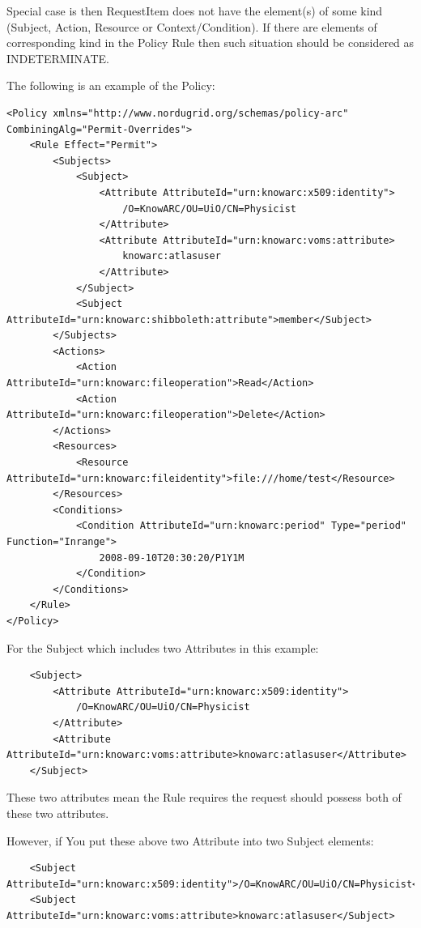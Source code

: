 \documentclass{article}                            %
\begin{document}
Special case is then RequestItem does not have the element(s) of some kind (Subject, Action, Resource or Context/Condition). If there are elements of corresponding kind in the Policy Rule then such situation should be considered as INDETERMINATE.

The following is an example of the Policy:

\begin{verbatim}
<Policy xmlns="http://www.nordugrid.org/schemas/policy-arc" CombiningAlg="Permit-Overrides">
    <Rule Effect="Permit">
        <Subjects>
            <Subject>
                <Attribute AttributeId="urn:knowarc:x509:identity">
                    /O=KnowARC/OU=UiO/CN=Physicist
                </Attribute>
                <Attribute AttributeId="urn:knowarc:voms:attribute>
                    knowarc:atlasuser
                </Attribute>
            </Subject>
            <Subject AttributeId="urn:knowarc:shibboleth:attribute">member</Subject>
        </Subjects>
        <Actions>
            <Action AttributeId="urn:knowarc:fileoperation">Read</Action>
            <Action AttributeId="urn:knowarc:fileoperation">Delete</Action>   
        </Actions>
        <Resources>
            <Resource AttributeId="urn:knowarc:fileidentity">file:///home/test</Resource>
        </Resources>
        <Conditions>
            <Condition AttributeId="urn:knowarc:period" Type="period" Function="Inrange">
                2008-09-10T20:30:20/P1Y1M
            </Condition>
        </Conditions>
    </Rule>
</Policy>
\end{verbatim}

For the Subject which includes two Attributes in this example:

\begin{verbatim}
    <Subject>
        <Attribute AttributeId="urn:knowarc:x509:identity">
            /O=KnowARC/OU=UiO/CN=Physicist
        </Attribute>
        <Attribute AttributeId="urn:knowarc:voms:attribute>knowarc:atlasuser</Attribute>
    </Subject>
\end{verbatim}

These two attributes mean the Rule requires the request should possess both of these two attributes.

However, if You put these above two Attribute into two Subject elements:

\begin{verbatim}
    <Subject AttributeId="urn:knowarc:x509:identity">/O=KnowARC/OU=UiO/CN=Physicist</Subject>
    <Subject AttributeId="urn:knowarc:voms:attribute>knowarc:atlasuser</Subject>
\end{verbatim}
\end{document}
